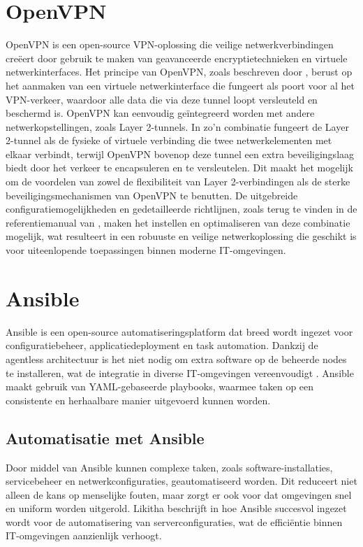   \section{OpenVPN}
  \label{sec:openvpn}

  OpenVPN is een open-source VPN-oplossing die veilige netwerkverbindingen creëert door gebruik te maken van geavanceerde encryptietechnieken en virtuele netwerkinterfaces. 
  Het principe van OpenVPN, zoals beschreven door \textcite{Seppaenen2014}, berust op het aanmaken van een virtuele netwerkinterface die fungeert als poort voor al het VPN-verkeer, 
  waardoor alle data die via deze tunnel loopt versleuteld en beschermd is. OpenVPN kan eenvoudig geïntegreerd worden met andere netwerkopstellingen, zoals Layer 2-tunnels. 
  In zo'n combinatie fungeert de Layer 2-tunnel als de fysieke of virtuele verbinding die twee netwerkelementen met elkaar verbindt, terwijl OpenVPN bovenop deze tunnel een extra beveiligingslaag biedt door het verkeer te encapsuleren en te versleutelen. 
  Dit maakt het mogelijk om de voordelen van zowel de flexibiliteit van Layer 2-verbindingen als de sterke beveiligingsmechanismen van OpenVPN te benutten. 
  De uitgebreide configuratiemogelijkheden en gedetailleerde richtlijnen, zoals terug te vinden in de referentiemanual van \textcite{Yonan}, maken het instellen en optimaliseren van deze combinatie mogelijk, 
  wat resulteert in een robuuste en veilige netwerkoplossing die geschikt is voor uiteenlopende toepassingen binnen moderne IT-omgevingen.

  \section{Ansible}
  \label{sec:ansible}

  Ansible is een open-source automatiseringsplatform dat breed wordt ingezet voor configuratiebeheer, applicatiedeployment en task automation. 
  Dankzij de agentless architectuur is het niet nodig om extra software op de beheerde nodes te installeren, wat de integratie in diverse IT-omgevingen vereenvoudigt \textcite{Documentation2025}. 
  Ansible maakt gebruik van YAML-gebaseerde playbooks, waarmee taken op een consistente en herhaalbare manier uitgevoerd kunnen worden.

  \subsection*{Automatisatie met Ansible}
  Door middel van Ansible kunnen complexe taken, zoals software-installaties, servicebeheer en netwerkconfiguraties, geautomatiseerd worden. 
  Dit reduceert niet alleen de kans op menselijke fouten, maar zorgt er ook voor dat omgevingen snel en uniform worden uitgerold. 
  Likitha beschrijft in \textcite{Likitha2022} hoe Ansible succesvol ingezet wordt voor de automatisering van serverconfiguraties, wat de efficiëntie binnen IT-omgevingen aanzienlijk verhoogt.
  
